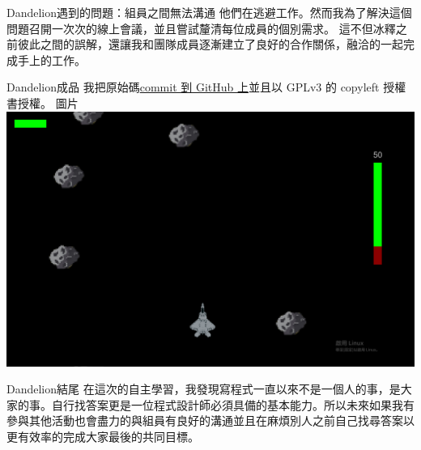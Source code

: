 \documentclass{article}
\begin{document}
\begin{large}
\begin{boxpar}{Dandelion}{遇到的問題：組員之間無法溝通}
    他們在逃避工作。然而我為了解決這個問題召開一次次的線上會議，並且嘗試釐清每位成員的個別需求。
    這不但冰釋之前彼此之間的誤解，還讓我和團隊成員逐漸建立了良好的合作關係，融洽的一起完成手上的工作。
\end{boxpar}
\newpage
\begin{boxpar}{Dandelion}{成品}
    我把原始碼\href{https://github.com/hsnucrc46/crcproject}{commit 到 GitHub
    上}並且以 GPLv3 的 copyleft 授權書授權。
    圖片
    \includegraphics[width=\linewidth]{src/game.png}
\end{boxpar}
\begin{boxpar}{Dandelion}{結尾}
    在這次的自主學習，我發現寫程式一直以來不是一個人的事，是大家的事。自行找答案更是一位程式設計師必須具備的基本能力。所以未來如果我有參與其他活動也會盡力的與組員有良好的溝通並且在麻煩別人之前自己找尋答案以更有效率的完成大家最後的共同目標。
\end{boxpar}
\end{large}
\end{document}
